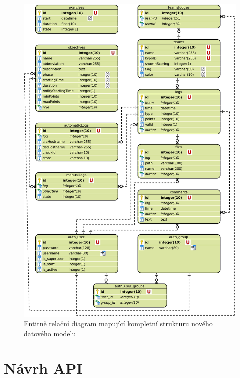 \documentclass[
  digital, %
  twoside, %
  table,   %
  lof,     %
  lot,     %
]{fithesis3}
\begin{document}
\begin{figure}
    \centering
    \includegraphics[width=12.5cm]{images/ERD-new-app.eps}
    \caption{Entitně relační diagram mapující kompletní strukturu nového datového modelu}
    \label{fig:erdNewApp}
\end{figure}

\newpage

\section{Návrh API}
\end{document}
